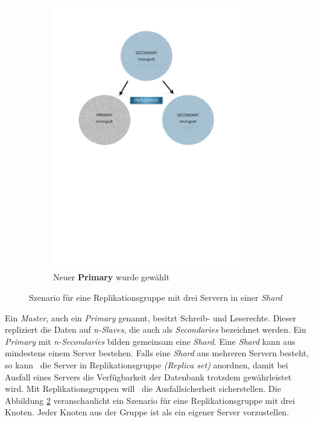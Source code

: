 \begin{figure}[H]
\begin{subfigure}[t]{0.49\textwidth}
        \includegraphics[trim = 28mm 139mm 28mm 29mm, clip, width=0.9\textwidth]{resources/replicaSet/newReplicaSet}
      \caption[Neuer \textbf{Primary} wurde gewählt]{Neuer \textbf{Primary} wurde gewählt}
      \label{img:newReplicaSet}
   \end{subfigure}
   \caption{Szenario für eine Replikationsgruppe mit drei Servern in einer \textit{Shard}}
   \label{img:replicaSetSzenario}
\end{figure}
Ein \textit{Master}, auch ein \textit{Primary} genannt, besitzt Schreib- und Leserechte. Dieser repliziert die Daten auf \textit{n-Slaves}, die auch als \textit{Secondaries} bezeichnet werden. Ein \textit{Primary} mit \textit{n-Secondaries} bilden gemeinsam eine \textit{Shard}. Eine \textit{Shard} kann aus mindestens einem Server bestehen. Falls eine \textit{Shard} aus mehreren Servern besteht, so kann \mongo\ die Server in Replikationsgruppe \textit{(Replica set)} anordnen, damit bei Ausfall eines Servers die Verfügbarkeit der Datenbank trotzdem gewährleistet wird. Mit Replikationsgruppen will \mongo\ die Ausfallsicherheit sicherstellen. Die Abbildung \ref{img:replicaSetSzenario} veranschaulicht ein Szenario für eine Replikationsgruppe mit drei Knoten. Jeder Knoten aus der Gruppe ist als ein eigener Server vorzustellen. %
